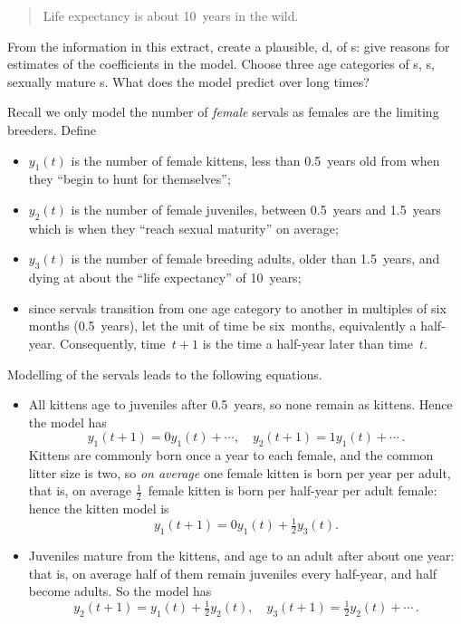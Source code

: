 \begin{example}
\begin{quote}
Life expectancy is about 10~years in the wild.
\end{quote}
From the information in this extract, create a plausible, d,   of s: give reasons for estimates of the coefficients in the model.
Choose three age categories of s, s, sexually mature s.
What does the model predict over long times?
\begin{solution} 
Recall we only model the number of \emph{female} servals as females are the limiting breeders.
Define 
\begin{itemize}
\item \(y_1(t)\) is the number of female kittens, less than 0.5~years old from when they ``begin to hunt for themselves'';
\item \(y_2(t)\) is the number of female juveniles, between 0.5~years and 1.5~years which is when they ``reach sexual maturity'' on average;
\item \(y_3(t)\) is the number of female breeding adults, older than 1.5~years, and dying at about the ``life expectancy'' of 10~years;
\item since servals transition from one age category to another in multiples of six months (0.5~years), let the unit of time be six~months, equivalently a half-year.  
Consequently, time~\(t+1\) is the time a half-year later than time~\(t\).
\end{itemize}
Modelling of the servals leads to the following equations.
\begin{itemize}
\item All kittens age to juveniles after 0.5~years, so none remain as kittens.  
Hence the model has 
\begin{equation*}
y_1(t+1)=0y_1(t)+\cdots,\quad
y_2(t+1)=1y_1(t)+\cdots\,.
\end{equation*}
Kittens are commonly born once a year to each female, and the common litter size is two, so \emph{on average} one female kitten is born per year per adult, that is, on average \(\frac12\)~female kitten is born per half-year per adult female: hence the kitten model is
\begin{equation*}
y_1(t+1)=0y_1(t)+\tfrac12y_3(t).
\end{equation*}

\item Juveniles mature from the kittens, and age to an adult after about one year: that is, on average half of them remain juveniles every half-year, and half become adults.
So the model has 
\begin{equation*}
y_2(t+1)=y_1(t)+\tfrac12y_2(t),\quad
y_3(t+1)=\tfrac12y_2(t)+\cdots\,.
\end{equation*}


\end{itemize}
\end{solution}
\end{example}
